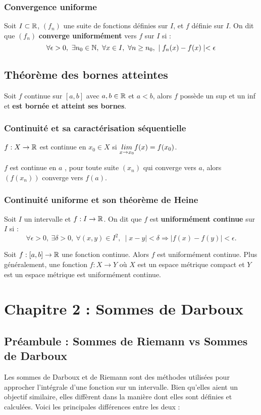 \subsubsection{Convergence uniforme}
\bd[CVU]
Soit $I \subset \mathbb{R}$, $(f_n)$ une suite de fonctions définies sur $I$, et $f$ définie sur $I$. On dit que $(f_n)$ \textbf{converge uniformément} vers $f$ sur $I$ si : $$\forall \epsilon > 0, ~ \exists n_0 \in \mathbb{N}, ~ \forall x \in I, ~ \forall n \geq n_0, ~ \mid f_n(x) - f(x) \mid < \epsilon$$
\ed 

\subsection{Théorème des bornes atteintes}
Soit $f$ continue sur $[a,b]$ avec $a,b \in \mathbb{R}$ et $a<b$, alors $f$ possède un sup et un inf et \textbf{est bornée et atteint ses bornes}.
\ep
\subsubsection{Continuité et sa caractérisation séquentielle}
\bd[Continuité]
$f : X \to \mathbb{R}$ est continue en $x_0 \in X$ si $\underset{x \to x_0}{lim} f(x) = f(x_0)$.
\ed

$f$ est continue en $a$ \ssi, pour toute suite $(x_n)$ qui converge vers $a$, alors $(f(x_n))$ converge vers $f(a)$.
\ep

\subsubsection{Continuité uniforme et son théorème de Heine}
Soit $I$ un intervalle et $f : I \to \mathbb{R}$. On dit que $f$ est \textbf{uniformément continue} sur $I$ si : $$\forall \epsilon > 0, ~ \exists \delta > 0, ~ \forall(x,y) \in I^2, ~ \mid x-y\mid < \delta \Rightarrow \mid f(x) - f(y) \mid < \epsilon.$$
\ed 

Soit $f:[a,b]\to \mathbb{R}$ une fonction continue. Alors $f$ est uniformément continue. Plus généralement, une fonction $f:X\to Y$ où $X$ est un espace métrique compact et $Y$ est un espace métrique est uniformément continue.
\ep 
\section{Chapitre 2 : Sommes de Darboux}
\subsection{Préambule : Sommes de Riemann vs Sommes de Darboux}
Les sommes de Darboux et de Riemann sont des méthodes utilisées pour approcher l'intégrale d'une fonction sur un intervalle. Bien qu'elles aient un objectif similaire, elles diffèrent dans la manière dont elles sont définies et calculées. Voici les principales différences entre les deux :


